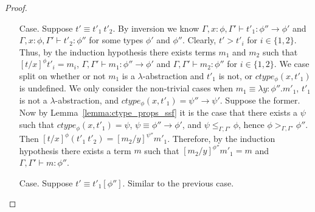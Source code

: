 \begin{proof}
\begin{itemize}
\item[Case.] Suppose $t' \equiv t'_1\ t'_2$.  By inversion we know
  $\Gamma, x:\phi, \Gamma' \vdash t'_1 : \phi'' \to \phi'$ and
  $\Gamma, x:\phi, \Gamma' \vdash t'_2 : \phi''$ for some types $\phi'$ and $\phi''$.
  Clearly, $t' > t'_i$ for $i \in \{1,2\}$.  Thus, by the induction hypothesis
  there exists terms $m_1$ and $m_2$ such that $[t/x]^\phi t'_i = m_i$,
  $\Gamma, \Gamma' \vdash m_1 : \phi'' \to \phi'$ and
  $\Gamma, \Gamma' \vdash m_2 : \phi''$ for
  $i \in \{1,2\}$.  We case split on whether or not $m_1$ is a $\lambda$-abstraction
  and $t'_1$ is not, or $ctype_\phi(x,t'_1)$ is undefined.  
  We only consider the non-trivial cases when 
  $m_1 \equiv \lambda y:\phi''.m'_1$, $t'_1$ is not a $\lambda$-abstraction, and 
  $ctype_\phi(x,t'_1) = \psi'' \to \psi'$.  Suppose the former.  
  Now by Lemma~\ref{lemma:ctype_props_ssf} it is the case that 
  there exists a $\psi$ such that $ctype_\phi(x,t'_1) = \psi$, 
  $\psi \equiv \phi'' \to \phi'$, and $\psi \leq_{\Gamma,\Gamma'} \phi$, hence
  $\phi >_{\Gamma,\Gamma'} \phi''$.
  Then $[t/x]^\phi (t'_1\ t'_2) = [m_2/y]^{\psi''} m'_1$.  
  Therefore, by the induction hypothesis there exists a 
  term $m$ such that $[m_2/y]^{\phi''} m'_1 = m$ and $\Gamma,\Gamma' \vdash m:\phi''$.
  
\item[Case.] Suppose $t' \equiv t'_1[\phi'']$. Similar to the previous
  case.  
\end{itemize}
\end{proof}

